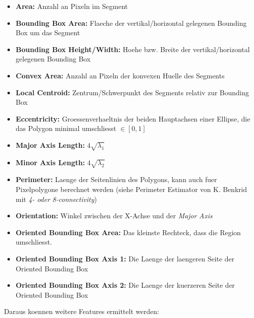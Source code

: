 \begin{itemize}
  \item \textbf{Area:} Anzahl an Pixeln im Segment
  \item \textbf{Bounding Box Area:} Flaeche der vertikal/horizontal gelegenen Bounding Box um das Segment
  \item \textbf{Bounding Box Height/Width:} Hoehe bzw. Breite der vertikal/horizontal gelegenen Bounding Box
  \item \textbf{Convex Area:} Anzahl an Pixeln der konvexen Huelle des Segments
  \item \textbf{Local Centroid:} Zentrum/Schwerpunkt des Segments relativ zur Bounding Box
  \item \textbf{Eccentricity:} Groessenverhaeltnis der beiden Hauptachsen einer Ellipse, die das Polygon minimal umschliesst $\in [0, 1]$
  \item \textbf{Major Axis Length:} $4 \sqrt{\lambda_1}$
  \item \textbf{Minor Axis Length:} $4 \sqrt{\lambda_2}$
  \item \textbf{Perimeter:} Laenge der Seitenlinien des Polygons, kann auch fuer Pixelpolygone berechnet werden (siehe Perimeter Estimator von K. Benkrid mit \emph{4- oder 8-connectivity})
  \item \textbf{Orientation:} Winkel zwischen der X-Achse und der \emph{Major Axis}
  \item \textbf{Oriented Bounding Box Area:} Das kleinste Rechteck, dass die Region umschliesst.
  \item \textbf{Oriented Bounding Box Axis 1:} Die Laenge der laengeren Seite der Oriented Bounding Box
  \item \textbf{Oriented Bounding Box Axis 2:} Die Laenge der kuerzeren Seite der Oriented Bounding Box
\end{itemize}

Daraus koennen weitere Features ermittelt werden:

